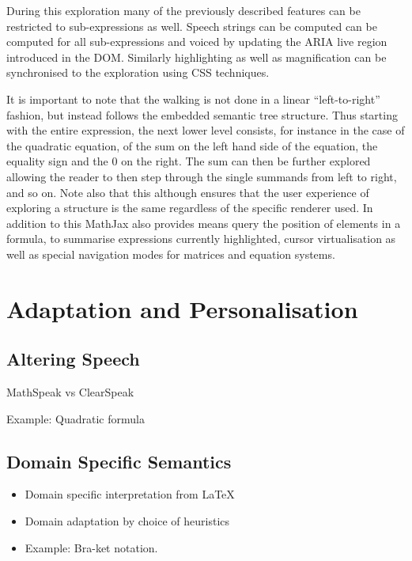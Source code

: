 \documentclass{sig-alternate}
\begin{document}
During this exploration many of the previously described features can be
restricted to sub-expressions as well. Speech strings can be computed can be
computed for all sub-expressions and voiced by updating the ARIA live region
introduced in the DOM. Similarly highlighting as well as magnification can be
synchronised to the exploration using CSS techniques.

It is important to note that the walking is not done in a linear
``left-to-right'' fashion, but instead follows the embedded semantic tree
structure. Thus starting with the entire expression, the next lower level
consists, for instance in the case of the quadratic equation, of the sum on the
left hand side of the equation, the equality sign and the $0$ on the right.  The
sum can then be further explored allowing the reader to then step through the
single summands from left to right, and so on.  Note also that this although
ensures that the user experience of exploring a structure is the same regardless
of the specific renderer used. In addition to this MathJax also provides means
query the position of elements in a formula, to summarise expressions currently
highlighted, cursor virtualisation as well as special navigation modes for
matrices and equation systems.




\section{Adaptation and Personalisation}
\label{sec:challenges}

\subsection{Altering Speech}

MathSpeak vs ClearSpeak

Example: Quadratic formula

\subsection{Domain Specific Semantics}

\begin{itemize}
\item Domain specific interpretation from {\LaTeX}
\item Domain adaptation by choice of heuristics
\item Example: Bra-ket notation.
\end{itemize}
\end{document}
